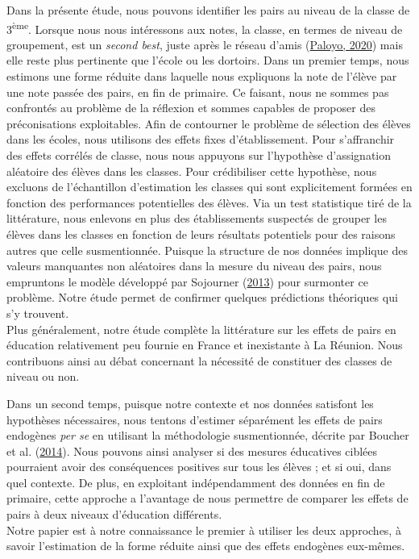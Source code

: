 \documentclass[
]{book}
\begin{document}
\quad Dans la présente étude, nous pouvons identifier les pairs au niveau de la classe de 3\textsuperscript{ème}. Lorsque nous nous intéressons aux notes, la classe, en termes de niveau de groupement, est un \emph{second best}, juste après le réseau d'amis (\protect\hyperlink{ref-PAL:20}{Paloyo, 2020}) mais elle reste plus pertinente que l'école ou les dortoirs. Dans un premier temps, nous estimons une forme réduite dans laquelle nous expliquons la note de l'élève par une note passée des pairs, en fin de primaire. Ce faisant, nous ne sommes pas confrontés au problème de la réflexion et sommes capables de proposer des préconisations exploitables. Afin de contourner le problème de sélection des élèves dans les écoles, nous utilisons des effets fixes d'établissement. Pour s'affranchir des effets corrélés de classe, nous nous appuyons sur l'hypothèse d'assignation aléatoire des élèves dans les classes. Pour crédibiliser cette hypothèse, nous excluons de l'échantillon d'estimation les classes qui sont explicitement formées en fonction des performances potentielles des élèves. Via un test statistique tiré de la littérature, nous enlevons en plus des établissements suspectés de grouper les élèves dans les classes en fonction de leurs résultats potentiels pour des raisons autres que celle susmentionnée. Puisque la structure de nos données implique des valeurs manquantes non aléatoires dans la mesure du niveau des pairs, nous empruntons le modèle développé par Sojourner (\protect\hyperlink{ref-SOJ:13}{2013}) pour surmonter ce problème. Notre étude permet de confirmer quelques prédictions théoriques qui s'y trouvent.\\
Plus généralement, notre étude complète la littérature sur les effets de pairs en éducation relativement peu fournie en France et inexistante à La Réunion. Nous contribuons ainsi au débat concernant la nécessité de constituer des classes de niveau ou non.

\quad Dans un second temps, puisque notre contexte et nos données satisfont les hypothèses nécessaires, nous tentons d'estimer séparément les effets de pairs endogènes \emph{per se} en utilisant la méthodologie susmentionnée, décrite par Boucher et al. (\protect\hyperlink{ref-BOU:eal:14}{2014}). Nous pouvons ainsi analyser si des mesures éducatives ciblées pourraient avoir des conséquences positives sur tous les élèves ; et si oui, dans quel contexte. De plus, en exploitant indépendamment des données en fin de primaire, cette approche a l'avantage de nous permettre de comparer les effets de pairs à deux niveaux d'éducation différents.\\
Notre papier est à notre connaissance le premier à utiliser les deux approches, à savoir l'estimation de la forme réduite ainsi que des effets endogènes eux-mêmes.\\
\end{document}
